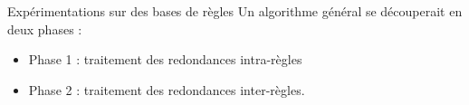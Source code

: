 \begin{frame}{Expérimentations sur des bases de règles}
    Un algorithme général se découperait en deux phases :
    \begin{itemize}
        \item Phase 1 : traitement des redondances intra-règles
        \item Phase 2 : traitement des redondances inter-règles.
    \end{itemize}
    
   
\end{frame}
